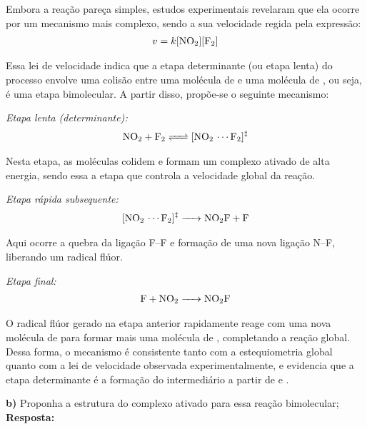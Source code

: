 Embora a reação pareça simples, estudos experimentais revelaram que ela ocorre por um mecanismo mais complexo, sendo a sua velocidade regida pela expressão:
\begin{align*}
v = k[\ce{NO2}][\ce{F2}]
\end{align*}

Essa lei de velocidade indica que a etapa determinante (ou etapa lenta) do processo envolve uma colisão entre uma molécula de  e uma molécula de , ou seja, é uma etapa bimolecular. A partir disso, propõe-se o seguinte mecanismo:

\textit{Etapa lenta (determinante):}
\begin{align*}
\ce{NO2 + F2 <=> [NO2 \cdots F2]^{\ddagger}}
\end{align*}

Nesta etapa, as moléculas colidem e formam um complexo ativado de alta energia, sendo essa a etapa que controla a velocidade global da reação.

\textit{Etapa rápida subsequente:}
\begin{align*}
\ce{[NO2 \cdots F2]^{\ddagger} -> NO2F + F}
\end{align*}

Aqui ocorre a quebra da ligação F–F e formação de uma nova ligação N–F, liberando um radical flúor.

\textit{Etapa final:}
\begin{align*}
\ce{F + NO2 -> NO2F}
\end{align*}

O radical flúor gerado na etapa anterior rapidamente reage com uma nova molécula de  para formar mais uma molécula de , completando a reação global.\\


Dessa forma, o mecanismo é consistente tanto com a estequiometria global quanto com a lei de velocidade observada experimentalmente, e evidencia que a etapa determinante é a formação do intermediário a partir de  e .

\vspace{0.4cm}

\textbf{b)} Proponha a estrutura do complexo ativado para essa reação bimolecular;\\

\textbf{Resposta:} 

